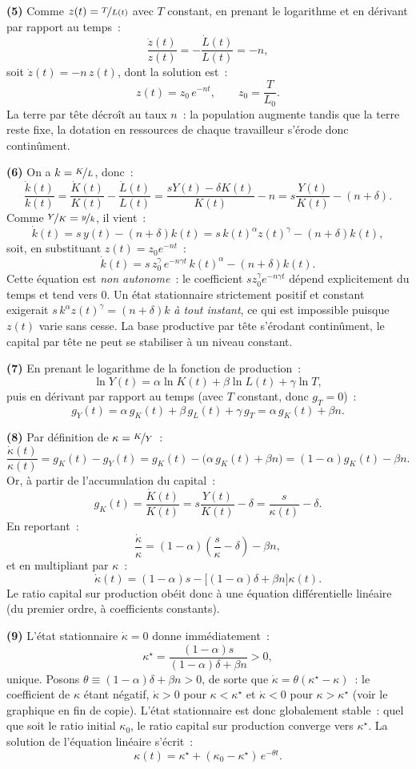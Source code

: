 \documentclass[11pt,a4paper,notitlepage]{article}
\begin{document}
\textbf{(5)} Comme $z(t)=\nicefrac{T}{L(t)}$ avec $T$ constant, en
prenant le logarithme et en dérivant par rapport au temps~:
\[
\frac{\dot z(t)}{z(t)} = -\frac{\dot L(t)}{L(t)} = -n,
\]
soit $\dot z(t)=-n\,z(t)$, dont la solution est~:
\[
z(t) = z_0\,e^{-nt},\qquad z_0=\frac{T}{L_0}.
\]
La terre par tête décroît au taux $n$~: la population augmente tandis
que la terre reste fixe, la dotation en ressources de chaque
travailleur s'érode donc continûment.

\textbf{(6)} On a $k=\nicefrac{K}{L}$, donc~:
\[
\frac{\dot k(t)}{k(t)} = \frac{\dot K(t)}{K(t)} - \frac{\dot L(t)}{L(t)}
= \frac{sY(t)-\delta K(t)}{K(t)} - n
= s\frac{Y(t)}{K(t)} - (n+\delta).
\]
Comme $\nicefrac{Y}{K}=\nicefrac{y}{k}$, il vient~:
\[
\dot k(t) = s\,y(t) - (n+\delta)k(t)
          = s\,k(t)^{\alpha}z(t)^{\gamma} - (n+\delta)k(t),
\]
soit, en substituant $z(t)=z_0 e^{-nt}$~:
\[
\dot k(t) = s\,z_0^{\gamma}\,e^{-n\gamma t}\,k(t)^{\alpha} - (n+\delta)k(t).
\]
Cette équation est \emph{non autonome}~: le coefficient
$s z_0^{\gamma}e^{-n\gamma t}$ dépend explicitement du temps et tend
vers $0$. Un état stationnaire strictement positif et constant
exigerait $s\,k^{\alpha}z(t)^{\gamma}=(n+\delta)k$ \emph{à tout
instant}, ce qui est impossible puisque $z(t)$ varie sans cesse. La
base productive par tête s'érodant continûment, le capital par tête ne
peut se stabiliser à un niveau constant.

\textbf{(7)} En prenant le logarithme de la fonction de production~:
\[
\ln Y(t) = \alpha\ln K(t) + \beta\ln L(t) + \gamma\ln T,
\]
puis en dérivant par rapport au temps (avec $T$ constant, donc
$g_T=0$)~:
\[
g_Y(t) = \alpha\, g_K(t) + \beta\, g_L(t) + \gamma\, g_T
       = \alpha\, g_K(t) + \beta n.
\]

\textbf{(8)} Par définition de $\kappa=\nicefrac{K}{Y}$~:
\[
\frac{\dot\kappa(t)}{\kappa(t)} = g_K(t) - g_Y(t)
= g_K(t) - \bigl(\alpha\, g_K(t)+\beta n\bigr)
= (1-\alpha)g_K(t) - \beta n.
\]
Or, à partir de l'accumulation du capital~:
\[
g_K(t) = \frac{\dot K(t)}{K(t)} = s\frac{Y(t)}{K(t)}-\delta
       = \frac{s}{\kappa(t)}-\delta.
\]
En reportant~:
\[
\frac{\dot\kappa}{\kappa} = (1-\alpha)\left(\frac{s}{\kappa}-\delta\right)-\beta n,
\]
et en multipliant par $\kappa$~:
\[
\dot\kappa(t) = (1-\alpha)s - \bigl[(1-\alpha)\delta+\beta n\bigr]\kappa(t).
\]
Le ratio capital sur production obéit donc à une équation
différentielle linéaire (du premier ordre, à coefficients constants).

\textbf{(9)} L'état stationnaire $\dot\kappa=0$ donne immédiatement~:
\[
\kappa^{\star} = \frac{(1-\alpha)s}{(1-\alpha)\delta+\beta n} > 0,
\]
unique. Posons $\theta\equiv(1-\alpha)\delta+\beta n>0$, de sorte que
$\dot\kappa=\theta(\kappa^{\star}-\kappa)$~: le coefficient de
$\kappa$ étant négatif, $\dot\kappa>0$ pour $\kappa<\kappa^{\star}$ et
$\dot\kappa<0$ pour $\kappa>\kappa^{\star}$ (voir le graphique en fin
de copie). L'état stationnaire est donc globalement stable~: quel que
soit le ratio initial $\kappa_0$, le ratio capital sur production
converge vers $\kappa^{\star}$. La solution de l'équation linéaire
s'écrit~:
\[
\kappa(t) = \kappa^{\star} + (\kappa_0-\kappa^{\star})\,e^{-\theta t}.
\]
\end{document}
